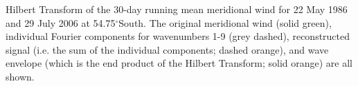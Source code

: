\label{fig:example_hilbert}
Hilbert Transform of the 30-day running mean meridional wind for 22 May 1986 and 29 July 2006 at 54.75$^{\circ}$South. The original meridional wind (solid green), individual Fourier components for wavenumbers 1-9 (grey dashed), reconstructed signal (i.e. the sum of the individual components; dashed orange), and wave envelope (which is the end product of the Hilbert Transform; solid orange) are all shown. 
